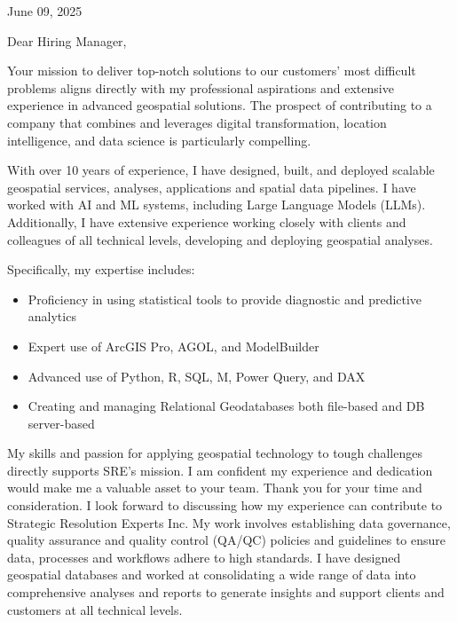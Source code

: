 \documentclass[letterpaper]{article}
\newenvironment{itemlist}
        {
            \vspace{-12pt}
            \begin{itemize} \itemsep 0pt
        }{
            \end{itemize}
            \vspace{-3pt}
        }
\newenvironment{itemlist}
        {
            \vspace{-12pt}
            \begin{itemize} \itemsep 0pt
        }{
            \end{itemize}
            \vspace{-3pt}
        }
\begin{document}
\large

\null\hfill June 09, 2025

Dear Hiring Manager,

Your mission to
deliver top-notch solutions to our customers’ most difficult problems
aligns directly with my professional aspirations and extensive experience in advanced geospatial solutions.
The prospect of contributing to a company that combines and leverages
digital transformation, location intelligence, and data science
is particularly compelling.

With over 10 years of experience, I have designed, built, and deployed scalable
geospatial services, analyses, applications and spatial data pipelines.
I have worked with AI and ML systems, including Large Language Models (LLMs).
Additionally, I have extensive experience working closely with clients and colleagues
of all technical levels, developing and deploying geospatial analyses.

Specifically, my expertise includes:  
\begin{itemlist}
\item Proficiency in using statistical tools to provide diagnostic and predictive analytics
\item Expert use of ArcGIS Pro, AGOL, and ModelBuilder
\item Advanced use of Python, R, SQL, M, Power Query, and DAX
\item Creating and managing Relational Geodatabases both file-based and DB server-based
\end{itemlist}

My skills and passion for applying geospatial technology to tough
challenges directly supports SRE’s mission. 
I am confident my experience and dedication would make me a valuable asset to your team. 
Thank you for your time and consideration. 
I look forward to discussing how my experience can contribute to Strategic Resolution Experts Inc.
My work involves establishing data governance, quality assurance and quality control (QA/QC)
policies and guidelines to ensure data, processes and workflows adhere to high standards.
I have designed geospatial databases and worked at consolidating
a wide range of data into comprehensive analyses and reports to generate
insights and support clients and customers at all technical levels.
\end{document}
